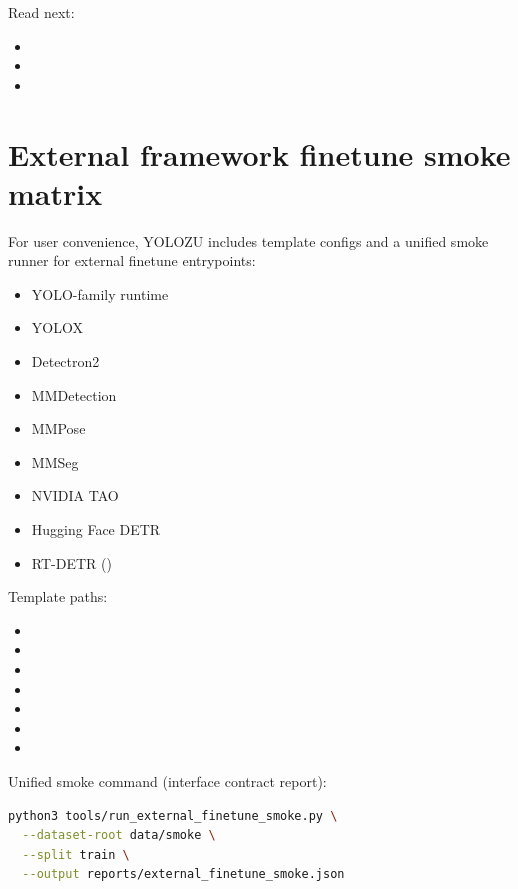Read next:
\begin{itemize}
  \item {}
  \item {}
  \item {}
\end{itemize}

\section{External framework finetune smoke matrix}
For user convenience, YOLOZU includes template configs and a unified smoke runner for external finetune entrypoints:
\begin{itemize}
  \item YOLO-family runtime
  \item YOLOX
  \item Detectron2
  \item MMDetection
  \item MMPose
  \item MMSeg
  \item NVIDIA TAO
  \item Hugging Face DETR
  \item RT-DETR ()
\end{itemize}

Template paths:
\begin{itemize}
  \item {}
  \item {}
  \item {}
  \item {}
  \item {}
  \item {}
  \item {}
\end{itemize}

Unified smoke command (interface contract report):
\begin{lstlisting}[language=bash]
python3 tools/run_external_finetune_smoke.py \
  --dataset-root data/smoke \
  --split train \
  --output reports/external_finetune_smoke.json
\end{lstlisting}

